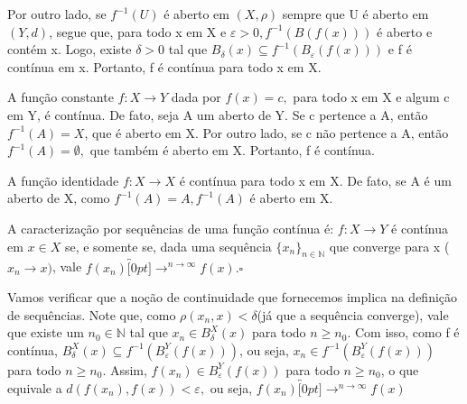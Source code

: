 \documentclass[metric_notes.tex]{subfiles}
\begin{document}
Por outro lado, se \(f^{-1}(U)\) é aberto em \((X, \rho )\) sempre que U é aberto em
\((Y, d)\), segue que, para todo x em X e \(\varepsilon >0, f^{-1}(B(f(x)))\) é aberto e contém x.
Logo, existe \(\delta  > 0\) tal que \(B_{\delta }(x)\subseteq{f^{-1}(B_{\varepsilon }(f(x)))}\) e f é contínua em x.
Portanto, f é contínua para todo x em X.
\begin{example}
	A função constante \(f:X\rightarrow Y\) dada por \(f(x) = c,\) para todo x em X e algum c em Y, é contínua.
	De fato, seja A um aberto de Y. Se c pertence a A, então \(f^{-1}(A) = X\), que é aberto em X. Por
	outro lado, se c não pertence a A, então \(f^{-1}(A) = \emptyset,\) que também é aberto em X. Portanto, f é contínua.
\end{example}
\begin{example}
	A função identidade \(f:X\rightarrow X\) é contínua para todo x em X. De fato, se A é um aberto de X,
	como \(f^{-1}(A) = A, f^{-1}(A)\) é aberto em X.
\end{example}
\begin{def*}
	A caracterização por sequências de uma função contínua é: \(f:X\rightarrow Y\) é contínua em \(x\in X\) se, e somente se, dada uma sequência \(\{x_{n}\}_{n\in \mathbb{N}}\) que
	converge para x (\(x_{n}\longrightarrow x)\), vale \(f(x_{n})\overbracket[0pt]{\longrightarrow}^{n\to \infty}f(x).\square\)
\end{def*}
Vamos verificar que a noção de continuidade que fornecemos implica na definição de sequências. Note que, como \(\rho (x_{n}, x) < \delta \)(já que a sequência converge), vale que existe um \(n_{0}\in \mathbb{N}\) tal que
\(x_{n}\in B_{\delta }^{X}(x)\) para todo \(n\geq n_{0}\). Com isso, como f é contínua, \(B_{\delta }^{X}(x)\subseteq{f^{-1}(B_{\varepsilon }^{Y}(f(x)))}\), ou seja, \(x_{n}\in f^{-1}(B_{\varepsilon }^{Y}(f(x)))\) para todo \(n\geq n_{0}.\)
Assim, \(f(x_{n})\in B_{\varepsilon }^{Y}(f(x))\) para todo \(n\geq n_{0}\), o que equivale a \(d(f(x_{n}), f(x)) < \varepsilon,\) ou seja, \(f(x_{n})\overbracket[0pt]{\longrightarrow}^{n\to \infty}f(x)\)
\end{document}
